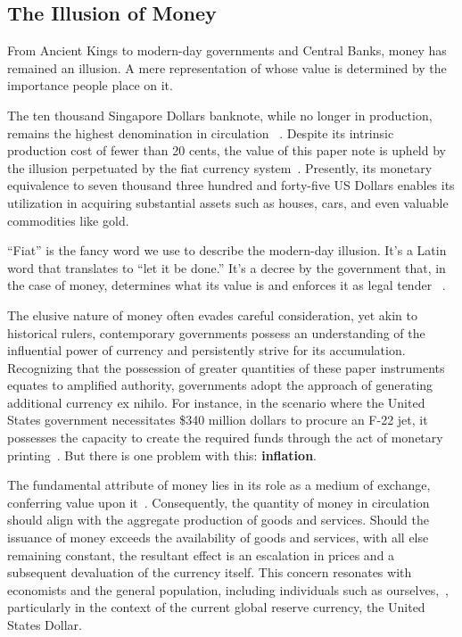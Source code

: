 \subsection{The Illusion of Money}
From Ancient Kings to modern-day governments and Central Banks, money has remained an illusion. A mere representation of
whose value is determined by the importance people place on it.

The ten thousand Singapore Dollars banknote, while no longer in production, remains the highest denomination in circulation
~\cite{goodhart1998}. Despite its intrinsic production cost of fewer than 20 cents, the value of this paper note is upheld
by the illusion perpetuated by the fiat currency system~\cite{gupta2019}. Presently, its monetary equivalence to seven
thousand three hundred and forty-five US Dollars enables its utilization in acquiring substantial assets such as houses,
cars, and even valuable commodities like gold.

“Fiat” is the fancy word we use to describe the modern-day illusion. It's a Latin word that translates to “let it be done.”
It's a decree by the government that, in the case of money, determines what its value is and enforces it as legal tender
~\cite{reinhart2018, friedman2000}.

The elusive nature of money often evades careful consideration, yet akin to historical rulers, contemporary governments
possess an understanding of the influential power of currency and persistently strive for its accumulation. Recognizing
that the possession of greater quantities of these paper instruments equates to amplified authority, governments adopt the
approach of generating additional currency ex nihilo. For instance, in the scenario where the United States government
necessitates \$340 million dollars to procure an F-22 jet, it possesses the capacity to create the required funds through
the act of monetary printing~\cite{graeber2011, mankiw2014}. But there is one problem with this: \textbf{inflation}.

The fundamental attribute of money lies in its role as a medium of exchange, conferring value upon it~\cite{mankiw2014}.
Consequently, the quantity of money in circulation should align with the aggregate production of goods and services. Should
the issuance of money exceeds the availability of goods and services, with all else remaining constant, the resultant effect
is an escalation in prices and a subsequent devaluation of the currency itself. This concern resonates with economists and
the general population, including individuals such as ourselves,~\cite{blinder2010}, particularly in the context of the
current global reserve currency, the United States Dollar.

